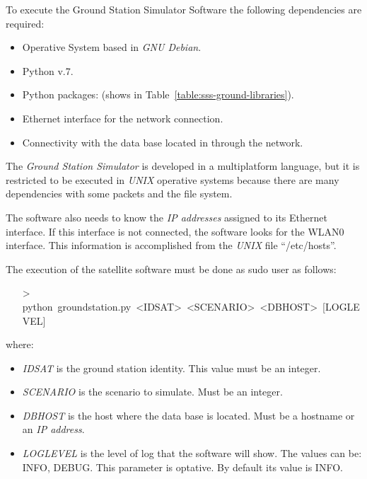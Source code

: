To execute the Ground Station Simulator Software the following dependencies are
required:
\begin{itemize}
\item Operative System based in \emph{GNU Debian}.
\item Python v.7.
\item Python packages: (shows in Table~\ref{table:sss-ground-libraries}).
\item Ethernet interface for the network connection.
\item Connectivity with the data base located in \bonfire through the network.
\end{itemize}

The \emph{Ground Station Simulator} is developed in a multiplatform language, but it is restricted to be executed in \emph{UNIX} operative systems because there are many dependencies with some packets and the file system.

The software also needs to know the \emph{IP addresses} assigned to its Ethernet interface. If this interface is not connected, the software looks for the WLAN0 interface. This information is accomplished from the \emph{UNIX} file ``/etc/hosts''.

The execution of the satellite software must be done as sudo user as follows:
\begin{itemize}
\item[>]python~groundstation.py~<IDSAT>~<SCENARIO>~<DBHOST>~[LOGLEVEL]
\end{itemize}

where:
\begin{itemize}
\item \emph{IDSAT} is the ground station identity. This value must be an integer.
\item \emph{SCENARIO} is the scenario to simulate. Must be an integer.
\item \emph{DBHOST} is the host where the data base is located. Must be a hostname or an \emph{IP address}.
\item \emph{LOGLEVEL} is the level of log that the software will show. The values can be: INFO, DEBUG. This parameter is optative. By default its value is INFO.
\end{itemize}
